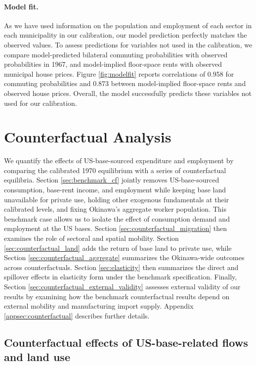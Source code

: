 \documentclass[12pt, unicode, a4paper]{article}
\newcommand{\1}{\mbox{1}\hspace{-0.25em}\mbox{l}} %
\begin{document}
\paragraph{Model fit.} As we have used information on the population and employment of each sector in each municipality in our calibration, our model prediction perfectly matches the observed values. To assess predictions for variables not used in the calibration, we compare model-predicted bilateral commuting probabilities with observed probabilities in 1967, and model-implied floor-space rents with observed municipal house prices.
Figure \ref{fig:modelfit} reports correlations of 0.958 for commuting probabilities and 0.873 between model-implied floor-space rents and observed house prices. Overall, the model successfully predicts these variables not used for our calibration.


\section{Counterfactual Analysis}\label{sec:counterfactuals}

We quantify the effects of US-base-sourced expenditure and employment by comparing the calibrated 1970 equilibrium with a series of counterfactual equilibria. Section \ref{sec:benchmark_cf} jointly removes US-base-sourced consumption, base-rent income, and employment while keeping base land unavailable for private use, holding other exogenous fundamentals at their calibrated levels, and fixing Okinawa's aggregate worker population. This benchmark case allows us to isolate the effect of consumption demand and employment at the US bases. Section \ref{sec:counterfactual_migration} then examines the role of sectoral and spatial mobility. Section \ref{sec:counterfactual_land} adds the return of base land to private use, while Section \ref{sec:counterfactual_aggregate} summarizes the Okinawa-wide outcomes across counterfactuals. 
Section \ref{sec:elasticity} then summarizes the direct and spillover effects in elasticity form under the benchmark specification.
Finally, Section \ref{sec:counterfactual_external_validity} assesses external validity of our results by examining how the benchmark counterfactual results depend on external mobility and manufacturing import supply. 
Appendix \ref{appsec:counterfactual} describes further details.

\subsection{Counterfactual effects of US-base-related flows and land use}\label{sec:counterfactual_main}
\end{document}
